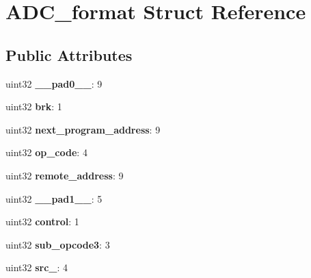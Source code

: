 \hypertarget{structADC__format}{}\section{A\+D\+C\+\_\+format Struct Reference}
\label{structADC__format}
\subsection*{Public Attributes}
\begin{DoxyCompactItemize}
\item 
\mbox{\label{structADC__format_abf36e8f996f1d6d285c7ade5cd1860dd}} 
uint32 {\bfseries \+\_\+\+\_\+pad0\+\_\+\+\_\+}\+: 9
\item 
\mbox{\label{structADC__format_a0a1d8d4daa287f71e948fa1247b72b50}} 
uint32 {\bfseries brk}\+: 1
\item 
\mbox{\label{structADC__format_a84953bdacab03465d01a0125c86c6244}} 
uint32 {\bfseries next\+\_\+program\+\_\+address}\+: 9
\item 
\mbox{\label{structADC__format_abe34ab00efacc6dd32c80e9acfddb0d4}} 
uint32 {\bfseries op\+\_\+code}\+: 4
\item 
\mbox{\label{structADC__format_a16f9eb4600015dd5b62ed9b74cee63e1}} 
uint32 {\bfseries remote\+\_\+address}\+: 9
\item 
\mbox{\label{structADC__format_a36a8e0319e6fe4f2e64ebf13067d341e}} 
uint32 {\bfseries \+\_\+\+\_\+pad1\+\_\+\+\_\+}\+: 5
\item 
\mbox{\label{structADC__format_ae70bc4864b8713b864c955ecdf8cfc5e}} 
uint32 {\bfseries control}\+: 1
\item 
\mbox{\label{structADC__format_a29895b87d1065596e231ca062a231089}} 
uint32 {\bfseries sub\+\_\+opcode3}\+: 3
\item 
\mbox{\label{structADC__format_ae7cf7700fd45b8e45689cca7ecf89ab5}} 
uint32 {\bfseries src\+\_}\+: 4
\item 

\end{DoxyCompactItemize}

